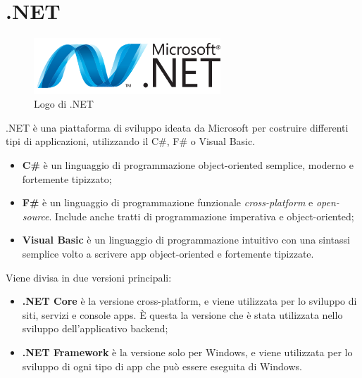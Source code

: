 \section{.NET}
\begin{figure}[h!]
\begin{center}
	\includegraphics[width=7cm]{images/dotnet.png}
	\caption{Logo di .NET}\label{fig:dotnet}
\end{center}
\end{figure}
.NET è una piattaforma di sviluppo ideata da Microsoft per costruire differenti tipi di applicazioni, utilizzando il C\#, F\# o Visual Basic.\cite{DOTNET} 
\begin{itemize}
\item \textbf{C\#} è un linguaggio di programmazione object-oriented semplice, moderno e fortemente tipizzato;
\item \textbf{F\#} è un linguaggio di programmazione funzionale \textit{cross-platform} e \textit{open-source}. Include anche tratti di programmazione imperativa e object-oriented;
\item \textbf{Visual Basic} è un linguaggio di programmazione intuitivo con una sintassi semplice volto a scrivere app object-oriented e fortemente tipizzate.
\end{itemize}
Viene divisa in due versioni principali:
\begin{itemize}
\item \textbf{.NET Core} è la versione cross-platform, e viene utilizzata per lo sviluppo di siti, servizi e console apps. È questa la versione che è stata utilizzata nello sviluppo dell'applicativo backend;
\item \textbf{.NET Framework} è la versione solo per Windows, e viene utilizzata per lo sviluppo di ogni tipo di app che può essere eseguita di Windows.
\end{itemize}
\pagebreak

